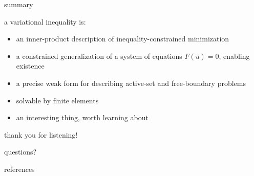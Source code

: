\documentclass[aspectratio=169,10pt]{beamer}
\begin{document}
\begin{frame}{summary}

a \alert{variational inequality} is:
\begin{itemize}
\item an inner-product description of inequality-constrained minimization
\item a constrained generalization of a system of equations $F(u)=0$, enabling existence
\item a precise weak form for describing active-set and free-boundary problems
\item solvable by finite elements 
\item an interesting thing, worth learning about
\end{itemize}

\centering
{\Large
\bigskip\bigskip
\alert{thank you for listening!}

\bigskip
\alert{questions?}
}
\end{frame}


\begin{frame}{references}

\end{frame}


\end{document}
